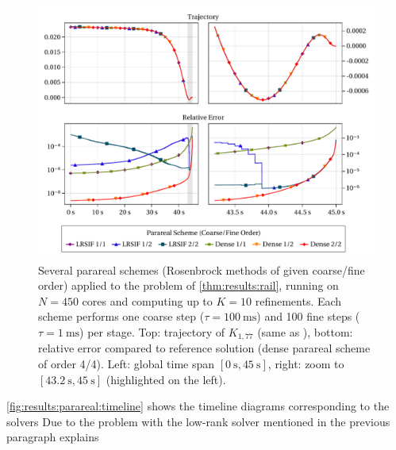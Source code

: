 \begin{figure}[t]
  \centering
  \includegraphics[width=\textwidth]{figures/fig_results_parareal.pdf}
  \caption[Parareal method applied to Rail problem]{%
    Several parareal schemes (Rosenbrock methods of given coarse/fine order)
    applied to the problem of \autoref{thm:results:rail},
    running on $N=450$ cores and
    computing up to $K=10$ refinements.
    Each scheme performs
    one coarse step ($\tau=\SI{100}{\milli\second}$) and
    100 fine steps ($\tau=\SI{1}{\milli\second}$) per stage.
    Top: trajectory of $K_{1,77}$ (same as \cite[Fig.~1]{Lang2015}),
    bottom: relative error compared to reference solution
    (dense parareal scheme of order 4/4).
    Left: global time span $[\SI{0}{\second}, \SI{45}{\second}]$,
    right: zoom to $[\SI[round-mode=off]{43.2}{\second}, \SI{45}{\second}]$ (highlighted on the left).
  }
  \label{fig:results:parareal:rail}
\end{figure}

\autoref{fig:results:parareal:timeline} shows the timeline diagrams corresponding to the solvers
Due to the problem with the low-rank  solver mentioned in the previous paragraph explains


